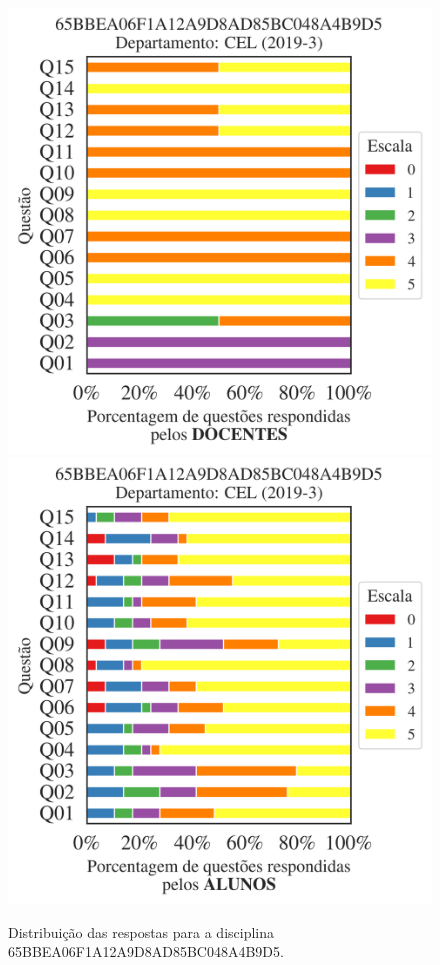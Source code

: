 \documentclass[a4paper,10pt]{article}
\begin{document}
\begin{figure}[h]
\centering
\includegraphics[width=0.485\linewidth]{analise_disciplina_departamento_CEL_65BBEA06F1A12A9D8AD85BC048A4B9D5_docentes.png}
\includegraphics[width=0.485\linewidth]{analise_disciplina_departamento_CEL_65BBEA06F1A12A9D8AD85BC048A4B9D5_alunos.png}
\caption{\label{fig:analise_geral_departamento}                Distribuição das respostas para a disciplina 65BBEA06F1A12A9D8AD85BC048A4B9D5. }
\end{figure}
\end{document}
